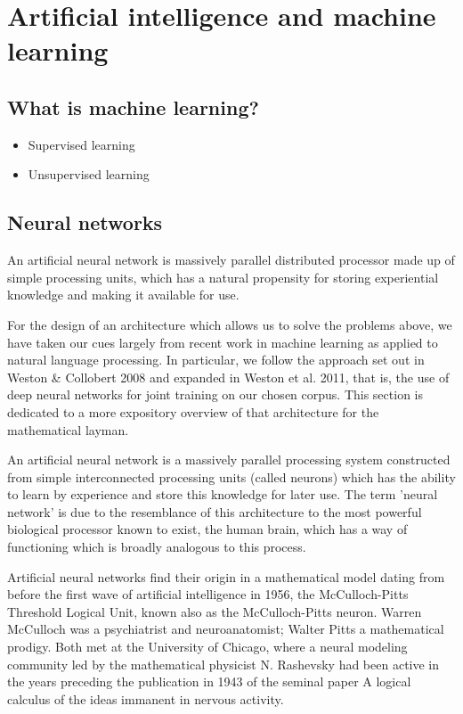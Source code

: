 \section{Artificial intelligence and machine learning}
\label{sec:aiml}

\subsection{What is machine learning?}
\label{sec:statistics}
\begin{itemize}
\item Supervised learning
\item Unsupervised learning
\end{itemize}

\subsection{Neural networks}
\label{sec:neuralnetworks}

An artificial neural network is massively parallel distributed
processor made up of simple processing units, which has a natural
propensity for storing experiential knowledge and making it available
for use.

For the design of an architecture which allows us to solve the
problems above, we have taken our cues largely from recent work in
machine learning as applied to natural language processing. In
particular, we follow the approach set out in Weston \& Collobert 2008
and expanded in Weston et al. 2011, that is, the use of deep neural
networks for joint training on our chosen corpus. This section is
dedicated to a more expository overview of that architecture for the
mathematical layman.

An artificial neural network is a massively parallel processing system
constructed from simple interconnected processing units (called
neurons) which has the ability to learn by experience and store this
knowledge for later use. The term 'neural network' is due to the
resemblance of this architecture to the most powerful biological
processor known to exist, the human brain, which has a way of
functioning which is broadly analogous to this process. 

Artificial neural networks find their origin in a mathematical model
dating from before the first wave of artificial intelligence in 1956,
the McCulloch-Pitts Threshold Logical Unit, known also as the
McCulloch-Pitts neuron. Warren McCulloch was a psychiatrist and
neuroanatomist; Walter Pitts a mathematical prodigy. Both met at the
University of Chicago, where a neural modeling community led by the
mathematical physicist N. Rashevsky had been active in the years
preceding the publication in 1943 of the seminal paper A logical
calculus of the ideas immanent in nervous activity. 

